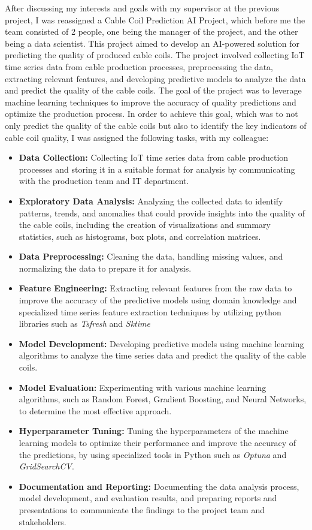 After discussing my interests and goals with my supervisor at the previous
project, I was reassigned a Cable Coil Prediction AI Project, which before me
the team consisted of 2 people, one being the manager of the project, and the
other being a data scientist. This project aimed to develop an AI-powered
solution for predicting the quality of produced cable coils. The project
involved collecting IoT time series data from cable production processes,
preprocessing the data, extracting relevant features, and developing predictive
models to analyze the data and predict the quality of the cable coils. The goal
of the project was to leverage machine learning techniques to improve the
accuracy of quality predictions and optimize the production process. In order
to achieve this goal, which was to not only predict the quality of the cable
coils but also to identify the key indicators of cable coil quality, I was
assigned the following tasks, with my colleague:
\begin{itemize}
    \item \textbf{Data Collection:} Collecting IoT time series data from cable production processes and storing it in a suitable format for analysis by communicating with the production team and IT department.
    \item \textbf{Exploratory Data Analysis:} Analyzing the collected data to identify patterns, trends, and anomalies that could provide insights into the quality of the cable coils, including the creation of visualizations and summary statistics, such as histograms, box plots, and correlation matrices.
    \item \textbf{Data Preprocessing:} Cleaning the data, handling missing values, and normalizing the data to prepare it for analysis.
    \item \textbf{Feature Engineering:} Extracting relevant features from the raw data to improve the accuracy of the predictive models using domain knowledge and specialized time series feature extraction techniques by utilizing python libraries such as \emph{Tsfresh} and \emph{Sktime}
    \item \textbf{Model Development:} Developing predictive models using machine learning algorithms to analyze the time series data and predict the quality of the cable coils.
    \item \textbf{Model Evaluation:} Experimenting with various machine learning algorithms, such as Random Forest, Gradient Boosting, and Neural Networks, to determine the most effective approach.
    \item \textbf{Hyperparameter Tuning:} Tuning the hyperparameters of the machine learning models to optimize their performance and improve the accuracy of the predictions, by using specialized tools in Python such as \emph{Optuna} and \emph{GridSearchCV}.
    \item \textbf{Documentation and Reporting:} Documenting the data analysis process, model development, and evaluation results, and preparing reports and presentations to communicate the findings to the project team and stakeholders.
\end{itemize}
